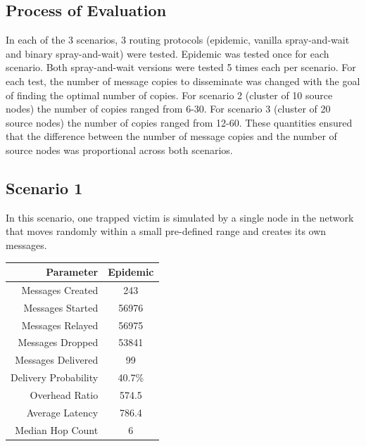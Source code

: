 \documentclass{article}
\begin{document}
\subsection{Process of Evaluation}
In each of the 3 scenarios, 3 routing protocols (epidemic, vanilla spray-and-wait and binary spray-and-wait) were tested. Epidemic was tested once for each scenario. Both spray-and-wait versions were tested 5 times each per scenario. For each test, the number of message copies to disseminate was changed with the goal of finding the optimal number of copies. For scenario 2 (cluster of 10 source nodes) the number of copies ranged from 6-30. For scenario 3 (cluster of 20 source nodes) the number of copies ranged from 12-60. These quantities ensured that the difference between the number of message copies and the number of source nodes was proportional across both scenarios.

\subsection{Scenario 1}
In this scenario, one trapped victim is simulated by a single node in the network that moves randomly within a small pre-defined range and creates its own messages.

\begin{center}
\begin{tabular}{|r|c|}
\hline
\textbf{Parameter} & \textbf{Epidemic} \\ \hline
Messages Created & 243 \\ \hline
Messages Started & 56976 \\ \hline
Messages Relayed & 56975 \\ \hline
Messages Dropped & 53841 \\ \hline
Messages Delivered & 99 \\ \hline
Delivery Probability & 40.7\%\\ \hline
Overhead Ratio & 574.5 \\ \hline
Average Latency & 786.4 \\ \hline
Median Hop Count & 6 \\ \hline
\end{tabular}
\end{center}
\end{document}
